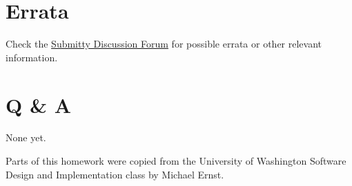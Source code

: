 \documentclass[11pt]{article}
\begin{document}
\section*{Errata}
Check the \href{https://submitty.cs.rpi.edu/courses/s23/csci2600/forum}{Submitty Discussion Forum} for possible errata or other relevant information.

\section*{Q \& A}
\noindent None yet.

\noindent Parts of this homework were copied from the University of Washington Software Design and Implementation class by Michael Ernst.
\end{document}
